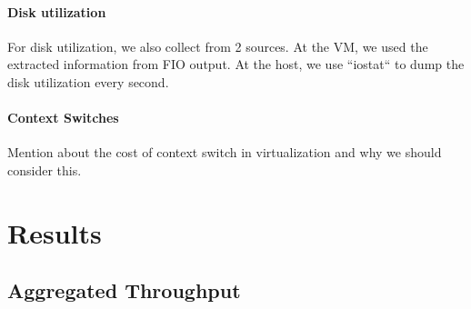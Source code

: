 \documentclass{acmsig}
\begin{document}
\paragraph{Disk utilization}
For disk utilization, we also collect from 2 sources. At the VM, we used the extracted information from FIO output. At the host, we use ``iostat`` to dump the disk utilization every second. %

\paragraph{Context Switches}
Mention about the cost of context switch in virtualization and why we should consider this.

\section{Results}

\subsection{Aggregated Throughput}
\end{document}
